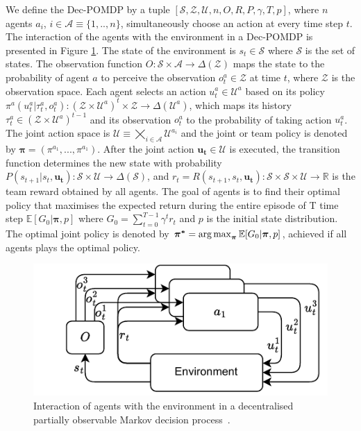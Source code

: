We define the Dec-POMDP by a tuple $[\mathcal{S}, \mathcal{Z}, \mathcal{U}, n, O, R, P, \gamma, T, p]$, where $n$ agents $a_i$, $i \in \mathcal{A} \equiv \{1,..,n\}$, simultaneously choose an action at every time step $t$.
The interaction of the agents with the environment in a Dec-POMDP is presented in Figure \ref{fig:ch3_decpomdp}.
The state of the environment is $s_t \in \mathcal{S}$ where $\mathcal{S}$ is the set of states.
The observation function $O:\mathcal{S} \times \mathcal{A} \rightarrow \Delta(\mathcal{Z})$ maps the state to the probability of agent $a$ to perceive the observation $o_t^{a} \in \mathcal{Z}$ at time $t$, where $\mathcal{Z}$ is the observation space.
Each agent selects an action $u_t^{a} \in \mathcal{U}^{a}$ based on its policy $\pi^{a}(u_t^{a}|\tau_t^{a},o_t^{a}): (\mathcal{Z} \times \mathcal{U}^a)^t \times \mathcal{Z}\rightarrow \Delta(\mathcal{U}^a)$, which maps its history $\tau_t^{a} \in (\mathcal{Z} \times \mathcal{U}^a)^{t-1}$ and its observation $o_t^{a}$ to the probability of taking action $u_t^{a}$. 
The joint action space is $\mathcal{U} \equiv \bigtimes_{i \in \mathcal{A}} \mathcal{U}^{a_i}$ and the joint or team policy is denoted by $\mathbf{\pi}=(\pi^{a_1},...,\pi^{a_1})$.
After the joint action $\mathbf{u_t} \in \mathcal{U}$ is executed, the transition function determines the new state with probability $P(s_{t+1}|s_t, \mathbf{u_t}): \mathcal{S} \times\mathcal{U} \rightarrow  \Delta(\mathcal{S}) $, and $r_t=R(s_{t+1}, s_t, \mathbf{u_t}): \mathcal{S} \times \mathcal{S} \times \mathcal{U} \rightarrow \mathbb{R}$ is the team reward obtained by all agents.
The goal of agents is to find their optimal policy that maximises the expected return during the entire episode of T time step $\mathbb{E}[G_0|\mathbf{\pi}, p]$ where $G_0=\sum_{t=0}^{T-1} \gamma^{t} r_{t}$ and $p$ is the initial state distribution.
The optimal joint policy is denoted by $\mathbf{\pi^{*}} =\argmax_{\mathbf{\pi}} \mathbb{E}[G_0|\mathbf{\pi}, p]$, achieved if all agents plays the optimal policy.

\begin{figure}
    \centering
    \includegraphics[width=0.8\linewidth]{tex_thesis/figures/ch3/DECPOMDP.pdf}
    \caption{Interaction of agents with the environment in a decentralised partially observable Markov decision process~\citep{DecPomdp}. }
    \label{fig:ch3_decpomdp}
\end{figure}

